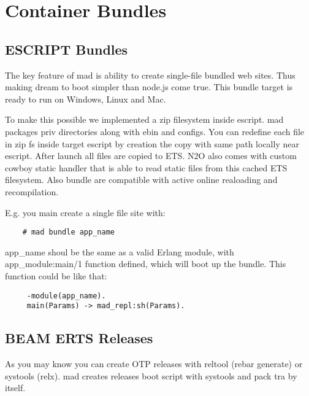 \section{Container Bundles}

\subsection{ESCRIPT Bundles}

The key feature of mad is ability to create single-file bundled web sites.
Thus making dream to boot simpler than node.js come true.
This bundle target is ready to run on Windows, Linux and Mac.

To make this possible we implemented a zip filesystem inside escript.
mad packages priv directories along with ebin and configs.
You can redefine each file in zip fs inside target
escript by creation the copy with same path locally near escript.
After launch all files are copied to ETS.
N2O also comes with custom cowboy static handler that is able to
read static files from this cached ETS filesystem.
Also bundle are compatible with active online realoading and recompilation.

E.g. you main create a single file site with:

\vspace{1\baselineskip}
\begin{lstlisting}
    # mad bundle app_name
\end{lstlisting}
\vspace{1\baselineskip}

app\_name shoul be the same as a valid Erlang module, with app\_module:main/1
function defined, which will boot up the bundle. This function could be like that:

\vspace{1\baselineskip}
\begin{lstlisting}
     -module(app_name).
     main(Params) -> mad_repl:sh(Params).
\end{lstlisting}
\vspace{1\baselineskip}

\subsection{BEAM ERTS Releases}

As you may know you can create OTP releases with
reltool (rebar generate) or systools (relx). mad creates releases boot
script with systools and pack tra by itself.

